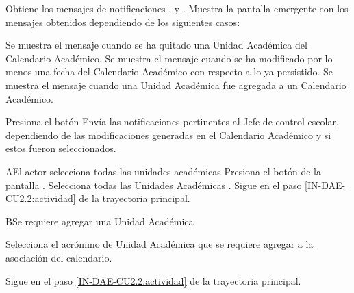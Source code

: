 \begin{UCtrayectoria}
    \UCpaso Obtiene los mensajes de notificaciones ,  y .
    \UCpaso  \label{IN-DAE-CU2.2:noti} Muestra la pantalla emergente  con los mensajes obtenidos dependiendo de los siguientes casos:
    \\
    \begin{Titemize}
    	\Titem Se muestra el mensaje  cuando se ha quitado una Unidad Académica del Calendario Académico.
    	\Titem Se muestra el mensaje  cuando se ha modificado por lo menos una fecha del Calendario Académico con respecto a lo ya persistido.
    	\Titem Se muestra el mensaje  cuando una Unidad Académica fue agregada a un Calendario Académico.
    \end{Titemize} 
	\UCpaso[\UCactor]Presiona el botón  
   	\UCpaso Envía las notificaciones pertinentes al Jefe de control escolar, dependiendo de las modificaciones generadas en el Calendario Académico y si estos fueron seleccionados.
   	
\end{UCtrayectoria}

\begin{UCtrayectoriaA}{A}{El actor selecciona todas las unidades académicas}
	\UCpaso[\UCactor] Presiona el botón  de la pantalla .
	\UCpaso Selecciona todas las Unidades Académicas .
	\UCpaso Sigue en el paso \ref{IN-DAE-CU2.2:actividad}  de la trayectoria principal.
\end{UCtrayectoriaA}


\begin{UCtrayectoriaA}{B}{Se requiere agregar una Unidad Académica}
	
	\UCpaso [\UCactor]  Selecciona el acrónimo de Unidad Académica que se requiere agregar a la asociación del calendario. 
	
	\UCpaso Sigue en el paso \ref{IN-DAE-CU2.2:actividad}  de la trayectoria principal.
	
\end{UCtrayectoriaA}

